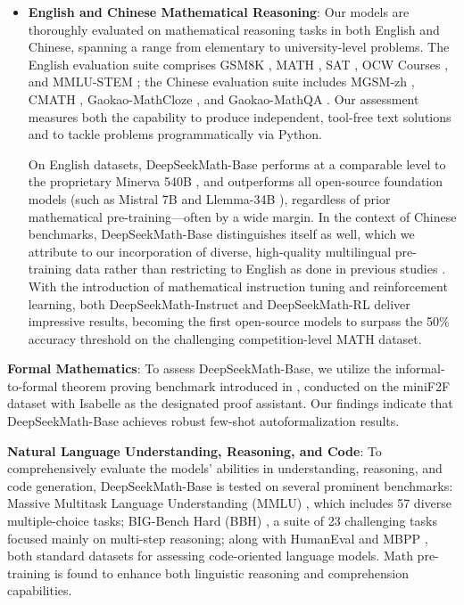 \begin{itemize}[topsep=0pt]
    \item \textbf{English and Chinese Mathematical Reasoning}: Our models are thoroughly evaluated on mathematical reasoning tasks in both English and Chinese, spanning a range from elementary to university-level problems. The English evaluation suite comprises GSM8K \citep{gsm8k}, MATH \citep{MATH}, SAT \citep{llemma}, OCW Courses \citep{minerva}, and MMLU-STEM \citep{mmlu}; the Chinese evaluation suite includes MGSM-zh \citep{mgsm}, CMATH \citep{wei2023cmath}, Gaokao-MathCloze \citep{agieval}, and Gaokao-MathQA \citep{agieval}. Our assessment measures both the capability to produce independent, tool-free text solutions and to tackle problems programmatically via Python.

    On English datasets, DeepSeekMath-Base performs at a comparable level to the proprietary Minerva 540B \citep{minerva}, and outperforms all open-source foundation models (such as Mistral 7B \citep{mistral} and Llemma-34B \citep{llemma}), regardless of prior mathematical pre-training—often by a wide margin. In the context of Chinese benchmarks, DeepSeekMath-Base distinguishes itself as well, which we attribute to our incorporation of diverse, high-quality multilingual pre-training data rather than restricting to English as done in previous studies \citep{minerva,llemma}. With the introduction of mathematical instruction tuning and reinforcement learning, both DeepSeekMath-Instruct and DeepSeekMath-RL deliver impressive results, becoming the first open-source models to surpass the 50\% accuracy threshold on the challenging competition-level MATH dataset.
\end{itemize}

\item \textbf{Formal Mathematics}: To assess DeepSeekMath-Base, we utilize the informal-to-formal theorem proving benchmark introduced in \citep{dsp_proof}, conducted on the miniF2F dataset \citep{minif2f} with Isabelle \citep{isabelle} as the designated proof assistant. Our findings indicate that DeepSeekMath-Base achieves robust few-shot autoformalization results.

\item \textbf{Natural Language Understanding, Reasoning, and Code}: To comprehensively evaluate the models’ abilities in understanding, reasoning, and code generation, DeepSeekMath-Base is tested on several prominent benchmarks: Massive Multitask Language Understanding (MMLU) \citep{mmlu}, which includes 57 diverse multiple-choice tasks; BIG-Bench Hard (BBH) \citep{bbh}, a suite of 23 challenging tasks focused mainly on multi-step reasoning; along with HumanEval \citep{codex} and MBPP \citep{mbpp}, both standard datasets for assessing code-oriented language models. Math pre-training is found to enhance both linguistic reasoning and comprehension capabilities.

